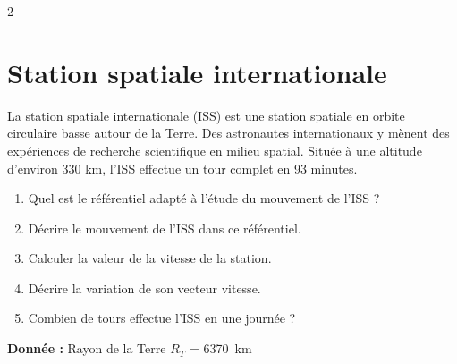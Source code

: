 \documentclass[a4paper,12pt,fleqn]{article}%
\begin{document}
\begin{multicols}{2}
\section{Station spatiale internationale}
La station spatiale internationale (ISS) est une station spatiale en orbite circulaire basse autour de la Terre. Des astronautes internationaux y mènent des expériences de recherche scientifique en milieu spatial. Située à une altitude d'environ 330 km, l'ISS effectue un tour complet en 93 minutes.
\begin{enumerate}
	\item Quel est le référentiel adapté à l’étude du mouvement de l’ISS ?
	\item Décrire le mouvement de l’ISS dans ce référentiel.
	\item Calculer la valeur de la vitesse de la station.
	\item Décrire la variation de son vecteur vitesse.
	\item Combien de tours effectue l’ISS en une journée ?
\end{enumerate}

\textbf{Donnée :} Rayon de la Terre $R_T$ = \SI{6370}{km}
\end{multicols}
\end{document}
